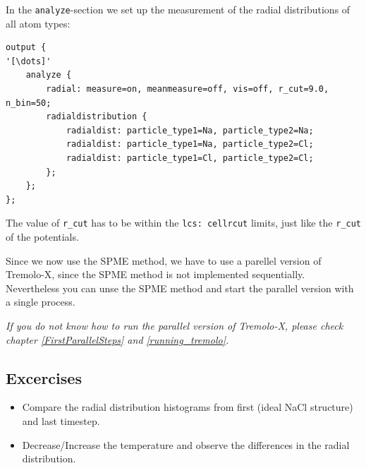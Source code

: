 In the \texttt{analyze}-section we set up the measurement of the radial
distributions of all atom types:

\begin{lstlisting}[escapechar=']
output {
'[\dots]'
    analyze {
        radial: measure=on, meanmeasure=off, vis=off, r_cut=9.0, n_bin=50;
        radialdistribution {
            radialdist: particle_type1=Na, particle_type2=Na;
            radialdist: particle_type1=Na, particle_type2=Cl;
            radialdist: particle_type1=Cl, particle_type2=Cl;
        };
    };
};
\end{lstlisting}

The value of \texttt{r\_cut} has to be within the \texttt{lcs: cellrcut}
limits, just like the \texttt{r\_cut} of the potentials.

Since we now use the SPME method, we have to use a parellel version
of Tremolo-X, since the SPME method is not implemented sequentially.
Nevertheless you can unse the SPME method and start the parallel 
version with a single process.

\emph{If you do not know how to run the parallel version of Tremolo-X,
please check chapter \ref{FirstParallelSteps} and \ref{running_tremolo}.}

\subsection{Excercises}
\begin{itemize}
    \item Compare the radial distribution histograms from first (ideal
        NaCl structure) and last timestep.
    \item Decrease/Increase the temperature and observe the differences
        in the radial distribution.
\end{itemize}

